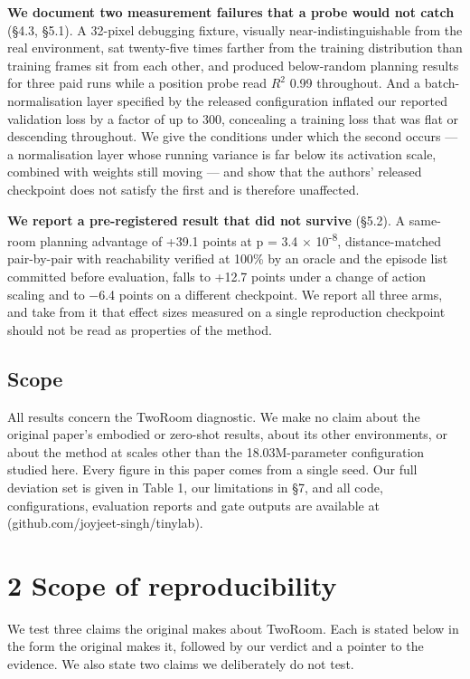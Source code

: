 \documentclass[10pt]{article}
\begin{document}
\textbf{We document two measurement failures that a probe would not catch} (\S{}4.3,
\S{}5.1). A 32-pixel debugging fixture, visually near-indistinguishable from the
real environment, sat twenty-five times farther from the training distribution
than training frames sit from each other, and produced below-random planning
results for three paid runs while a position probe read $R^{2}$ 0.99 throughout. And
a batch-normalisation layer specified by the released configuration inflated our reported validation loss by a factor of up to 300, concealing a
training loss that was flat or descending throughout. We give the
conditions under which the second occurs --- a normalisation layer whose running
variance is far below its activation scale, combined with weights still moving
--- and show that the authors' released checkpoint does not satisfy the first
and is therefore unaffected.

\textbf{We report a pre-registered result that did not survive} (\S{}5.2). A same-room
planning advantage of +39.1 points at p = 3.4 $\times$ 10\textsuperscript{-8}, distance-matched
pair-by-pair with reachability verified at 100\% by an oracle and the episode
list committed before evaluation, falls to +12.7 points under a change of action
scaling and to $-$6.4 points on a different checkpoint. We report all three arms,
and take from it that effect sizes measured on a single reproduction checkpoint
should not be read as properties of the method.

\subsection{Scope}\label{scope}

All results concern the TwoRoom diagnostic. We make no claim about the original
paper's embodied or zero-shot results, about its other environments, or about
the method at scales other than the 18.03M-parameter configuration studied here.
Every figure in this paper comes from a single seed. Our full deviation set is
given in Table 1, our limitations in \S{}7, and all code, configurations,
evaluation reports and gate outputs are available at (github.com/joyjeet-singh/tinylab).

\section{2 Scope of reproducibility}\label{scope-of-reproducibility}

We test three claims the original makes about TwoRoom. Each is stated below in
the form the original makes it, followed by our verdict and a pointer to the
evidence. We also state two claims we deliberately do not test.
\end{document}
